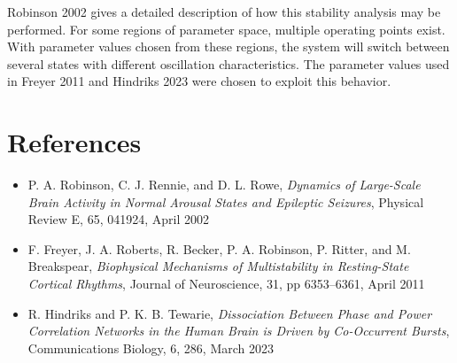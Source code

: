 Robinson 2002 gives a detailed description of how this stability analysis
may be performed. For some regions of parameter space, multiple operating
points exist. With parameter values chosen from these regions, the system
will switch between several states with different oscillation
characteristics. The parameter values used in Freyer 2011 and Hindriks 2023
were chosen to exploit this behavior.

%
%
\section{References}
\label{sect-robinson-refs}

\begin{itemize}
%
\item P. A. Robinson, C. J. Rennie, and D. L. Rowe, \textit{Dynamics of
Large-Scale Brain Activity in Normal Arousal States and Epileptic Seizures},
Physical Review E, 65, 041924, April 2002
%
\item F. Freyer, J. A. Roberts, R. Becker, P. A. Robinson, P. Ritter, and
M. Breakspear, \textit{Biophysical Mechanisms of Multistability in
Resting-State Cortical Rhythms}, Journal of Neuroscience, 31,
pp 6353--6361, April 2011
%
\item R. Hindriks and P. K. B. Tewarie, \textit{Dissociation Between Phase
and Power Correlation Networks in the Human Brain is Driven by Co-Occurrent
Bursts}, Communications Biology, 6, 286, March 2023
%
\end{itemize}

%
%
